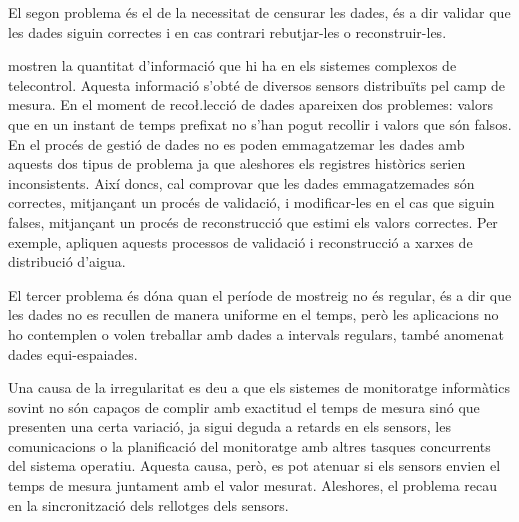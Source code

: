 El segon problema és el de la necessitat de censurar les dades, és a dir validar que les dades siguin correctes i en cas contrari rebutjar-les o reconstruir-les. 

\textcite{quevedo10} mostren la quantitat d'informació que hi ha en els sistemes complexos de telecontrol. Aquesta informació s'obté de diversos sensors distribuïts pel camp de mesura.
En el moment de reco\l.lecció de dades apareixen dos problemes: valors que en un instant de temps prefixat no s'han pogut recollir i valors que són falsos. En el procés de gestió de dades no es poden emmagatzemar les dades amb aquests dos tipus de problema ja que aleshores els registres històrics serien inconsistents. 
Així doncs, cal comprovar que les dades emmagatzemades són correctes, mitjançant un procés de validació, i modificar-les en el cas que siguin falses, mitjançant un procés de reconstrucció que estimi els valors correctes. Per exemple, \citeauthor{quevedo10} apliquen aquests processos de validació i reconstrucció a xarxes de distribució d'aigua.


El tercer problema és dóna quan el període de mostreig no és regular, és a dir que les dades no es recullen de manera uniforme en el temps, però les aplicacions no ho contemplen o volen treballar amb dades a intervals regulars, també anomenat dades equi-espaiades.

Una causa de la irregularitat es deu a que els sistemes de monitoratge informàtics sovint no són capaços de complir amb exactitud el temps de mesura sinó que presenten una certa variació, ja sigui deguda a retards en els sensors, les comunicacions o la planificació del monitoratge amb altres tasques concurrents del sistema operatiu. Aquesta causa, però, es pot atenuar si els sensors envien el temps de mesura juntament amb el valor mesurat. Aleshores, el problema recau en la sincronització dels rellotges dels sensors.

